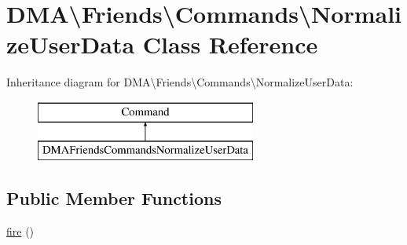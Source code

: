 \hypertarget{classDMA_1_1Friends_1_1Commands_1_1NormalizeUserData}{}\section{D\+M\+A\textbackslash{}Friends\textbackslash{}Commands\textbackslash{}Normalize\+User\+Data Class Reference}
\label{classDMA_1_1Friends_1_1Commands_1_1NormalizeUserData}
Inheritance diagram for D\+M\+A\textbackslash{}Friends\textbackslash{}Commands\textbackslash{}Normalize\+User\+Data\+:\begin{figure}[H]
\begin{center}
\leavevmode
\includegraphics[height=2.000000cm]{dc/d26/classDMA_1_1Friends_1_1Commands_1_1NormalizeUserData}
\end{center}
\end{figure}
\subsection*{Public Member Functions}
\begin{DoxyCompactItemize}
\item 
\hyperlink{classDMA_1_1Friends_1_1Commands_1_1NormalizeUserData_abb6a366bfe6d71d57c38eac99befc8f6}{fire} ()
\end{DoxyCompactItemize}
